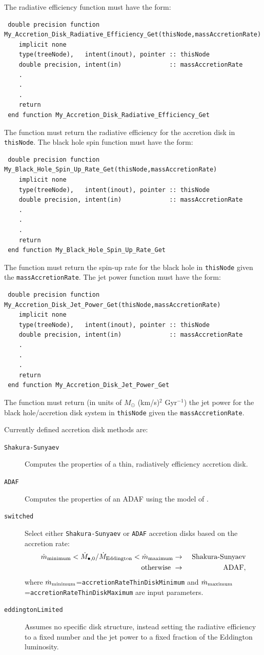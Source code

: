 The radiative efficiency function must have the form:
\begin{verbatim}
 double precision function My_Accretion_Disk_Radiative_Efficiency_Get(thisNode,massAccretionRate)
    implicit none
    type(treeNode),   intent(inout), pointer :: thisNode
    double precision, intent(in)             :: massAccretionRate
    .
    .
    .
    return
 end function My_Accretion_Disk_Radiative_Efficiency_Get
\end{verbatim}
The function must return the radiative efficiency for the accretion disk in {\tt thisNode}. The black hole spin function must have the form:
\begin{verbatim}
 double precision function My_Black_Hole_Spin_Up_Rate_Get(thisNode,massAccretionRate)
    implicit none
    type(treeNode),   intent(inout), pointer :: thisNode
    double precision, intent(in)             :: massAccretionRate
    .
    .
    .
    return
 end function My_Black_Hole_Spin_Up_Rate_Get
\end{verbatim}
The function must return the spin-up rate for the black hole in {\tt thisNode} given the {\tt massAccretionRate}. The jet power function must have the form:
\begin{verbatim}
 double precision function My_Accretion_Disk_Jet_Power_Get(thisNode,massAccretionRate)
    implicit none
    type(treeNode),   intent(inout), pointer :: thisNode
    double precision, intent(in)             :: massAccretionRate
    .
    .
    .
    return
 end function My_Accretion_Disk_Jet_Power_Get
\end{verbatim}
The function must return (in units of $M_\odot$ (km/s)$^2$ Gyr$^{-1}$) the jet power for the black hole/accretion disk system in {\tt thisNode} given the {\tt massAccretionRate}.

Currently defined accretion disk methods are:
\begin{description}
 \item [{\tt Shakura-Sunyaev}] Computes the properties of a thin, radiatively efficiency accretion disk.
 \item [{\tt ADAF}] Computes the properties of an ADAF using the model of \cite{benson_maximum_2009}.
 \item [{\tt switched}] Select either {\tt Shakura-Sunyaev} or {\tt ADAF} accretion disks based on the accretion rate:
 \begin{eqnarray}
  \dot{m}_{\rm minimum} < \dot{M}_{\bullet, 0}/\dot{M}_{\rm Eddington} < \dot{m}_{\rm maximum} &\rightarrow& \hbox{ Shakura-Sunyaev} \nonumber \\
  \hbox{otherwise } &\rightarrow& \hbox{ ADAF},
 \end{eqnarray}
 where $\dot{m}_{\rm minimum}$={\tt accretionRateThinDiskMinimum} and $\dot{m}_{\rm maximum}$={\tt accretionRateThinDiskMaximum} are input parameters.
 \item [{\tt eddingtonLimited}] Assumes no specific disk structure, instead setting the radiative efficiency to a fixed number and the jet power to a fixed fraction of the Eddington luminosity.
\end{description}

